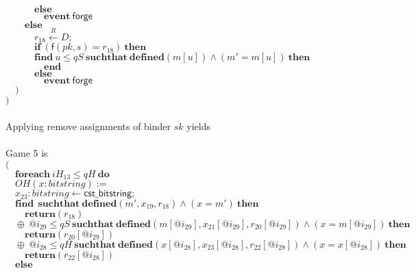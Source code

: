 \documentclass{article}
\newcommand{\store}{\leftarrow}
\newcommand{\getR}{\stackrel{R}{\store}}
\newcommand{\kw}[1]{\mathbf{#1}}
\newcommand{\kwf}[1]{\mathsf{#1}}
\newcommand{\var}[1]{\mathit{#1}}
\newcommand{\kwt}[1]{\mathit{#1}}
\newcommand{\kwp}[1]{\mathit{#1}}
\begin{document}
\begin{tabbing}
$\quad \quad \quad \kw{else}$\\
$\quad \quad \quad \quad \kw{event}\ \kwf{forge}$\\
$\quad \quad \kw{else}$\\
$\quad \quad \quad \var{r}_{18} \getR \kwt{D};$\\
$\quad \quad \quad \kw{if}\ (\kwf{f}(\var{pk}, \var{s})  =  \var{r}_{18})\ \kw{then}$\\
$\quad \quad \quad \kw{find}\ \var{u} \leq \kwp{qS}\ \kw{suchthat}\ \kw{defined}(\var{m}[\var{u}])\wedge (\var{m'}  =  \var{m}[\var{u}])\ \kw{then}$\\
$\quad \quad \quad \quad \kw{end}$\\
$\quad \quad \quad \kw{else}$\\
$\quad \quad \quad \quad \kw{event}\ \kwf{forge}$\\
$\quad )$\\
$)$\\
$ $\\
\\
Applying remove assignments of binder $\var{sk}$ yields\\
\\
Game 5 is\\
$($\\
$\quad \kw{foreach}\ \var{iH}_{13} \leq \kwp{qH}\ \kw{do}$\\
$\quad OH(\var{x}: \kwt{bitstring}) :=$\\
$\quad \var{x}_{23}: \kwt{bitstring} \store \kwf{cst\_bitstring};$\\
$\quad \kw{find}\ \ \kw{suchthat}\ \kw{defined}(\var{m'}, \var{x}_{19}, \var{r}_{18})\wedge (\var{x}  =  \var{m'})\ \kw{then}$\\
$\quad \quad \kw{return}\kwf{}(\var{r}_{18})$\\
$\quad \oplus\ \var{@i}_{29} \leq \kwp{qS}\ \kw{suchthat}\ \kw{defined}(\var{m}[\var{@i}_{29}], \var{x}_{21}[\var{@i}_{29}], \var{r}_{20}[\var{@i}_{29}])\wedge (\var{x}  =  \var{m}[\var{@i}_{29}])\ \kw{then}$\\
$\quad \quad \kw{return}\kwf{}(\var{r}_{20}[\var{@i}_{29}])$\\
$\quad \oplus\ \var{@i}_{28} \leq \kwp{qH}\ \kw{suchthat}\ \kw{defined}(\var{x}[\var{@i}_{28}], \var{x}_{23}[\var{@i}_{28}], \var{r}_{22}[\var{@i}_{28}])\wedge (\var{x}  =  \var{x}[\var{@i}_{28}])\ \kw{then}$\\
$\quad \quad \kw{return}\kwf{}(\var{r}_{22}[\var{@i}_{28}])$\\
$\quad \kw{else}$\\

\end{tabbing}
\end{document}
